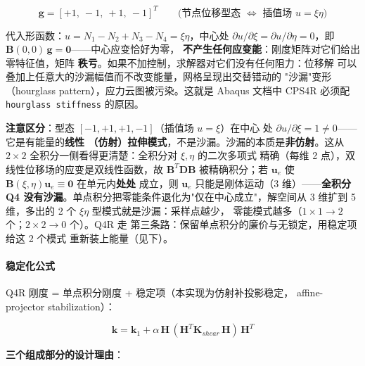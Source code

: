 \documentclass[12pt,a4paper]{ctexart}
\begin{document}
\begin{equation}
\mathbf{g} = [+1,\ -1,\ +1,\ -1]^T
\qquad\text{(节点位移型态 $\Leftrightarrow$ 插值场 $u = \xi\eta$)}
\end{equation}

代入形函数：$u = N_1 - N_2 + N_3 - N_4 = \xi\eta$，中心处
$\partial u/\partial\xi = \partial u/\partial\eta = 0$，即
$\mathbf{B}(0,0)\,\mathbf{g} = \mathbf{0}$——中心应变恰好为零，
\textbf{不产生任何应变能}：刚度矩阵对它们给出零特征值，矩阵
\textbf{秩亏}。如果不加控制，求解器对它们没有任何阻力：位移解
可以叠加上任意大的沙漏幅值而不改变能量，网格呈现出交替错动的
"沙漏"变形（hourglass pattern），应力云图被污染。这就是 Abaqus
文档中 CPS4R 必须配 \texttt{hourglass stiffness} 的原因。

\textbf{注意区分}：型态 $[-1,+1,+1,-1]$（插值场 $u = \xi$）在中心
处 $\partial u/\partial\xi = 1 \neq 0$——它是有能量的\textbf{线性
（仿射）拉伸模式}，不是沙漏。沙漏的本质是\textbf{非仿射}。这从
$2\times2$ 全积分一侧看得更清楚：全积分对 $\xi,\eta$ 的二次多项式
精确（每维 2 点），双线性位移场的应变是双线性函数，故
$\mathbf{B}^T\mathbf{D}\mathbf{B}$ 被精确积分；若 $\mathbf{u}_e$ 使
$\mathbf{B}(\xi,\eta)\mathbf{u}_e \equiv \mathbf{0}$ 在单元内\textbf{处处}
成立，则 $\mathbf{u}_e$ 只能是刚体运动（3 维）——\textbf{全积分 Q4
没有沙漏}。单点积分把零能条件退化为"仅在中心成立"，解空间从
3 维扩到 5 维，多出的 2 个 $\xi\eta$ 型模式就是沙漏：采样点越少，
零能模式越多（$1\times1 \to 2$ 个；$2\times2 \to 0$ 个）。Q4R 走
第三条路：保留单点积分的廉价与无锁定，用稳定项给这 2 个模式
重新装上能量（见下）。

\paragraph{稳定化公式}

Q4R 刚度 = 单点积分刚度 + 稳定项（本实现为仿射补投影稳定，
affine-projector stabilization）：

\begin{equation}
\mathbf{k} = \mathbf{k}_1 + \alpha\, \mathbf{H}\,(\mathbf{H}^T
\mathbf{K}_{shear}\, \mathbf{H})\, \mathbf{H}^T
\label{eq:q4r-stab}
\end{equation}

\textbf{三个组成部分的设计理由}：
\end{document}
